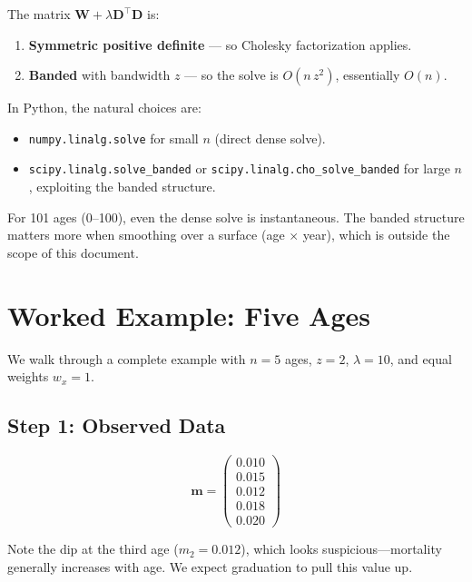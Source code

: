 \documentclass[11pt,a4paper]{article}
\begin{document}
\begin{application}
The matrix $\bm{W} + \lambda\bm{D}^\top\bm{D}$ is:
\begin{enumerate}[nosep]
  \item \textbf{Symmetric positive definite} --- so Cholesky factorization applies.
  \item \textbf{Banded} with bandwidth $z$ --- so the solve is $O(n\,z^2)$, essentially $O(n)$.
\end{enumerate}

In Python, the natural choices are:
\begin{itemize}[nosep]
  \item \texttt{numpy.linalg.solve} for small $n$ (direct dense solve).
  \item \texttt{scipy.linalg.solve\_banded} or \texttt{scipy.linalg.cho\_solve\_banded} for large $n$, exploiting the banded structure.
\end{itemize}

For 101 ages (0--100), even the dense solve is instantaneous.  The banded structure matters more when smoothing over a surface (age $\times$ year), which is outside the scope of this document.
\end{application}

\section{Worked Example: Five Ages}

We walk through a complete example with $n=5$ ages, $z=2$, $\lambda=10$, and equal weights $w_x = 1$.

\subsection*{Step 1: Observed Data}

\[
\bm{m} = \begin{pmatrix} 0.010 \\ 0.015 \\ 0.012 \\ 0.018 \\ 0.020 \end{pmatrix}
\]

Note the dip at the third age ($m_2 = 0.012$), which looks suspicious---mortality generally increases with age.  We expect graduation to pull this value up.
\end{document}
